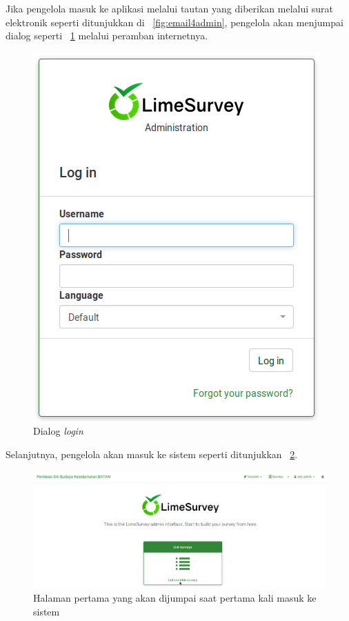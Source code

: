 Jika pengelola masuk ke aplikasi melalui tautan yang diberikan melalui surat elektronik seperti ditunjukkan di \figurename~\ref{fig:email4admin}, pengelola akan menjumpai dialog seperti \figurename~\ref{fig:login} melalui peramban internetnya.
\begin{figure}
  \begin{center}
    \includegraphics[scale=.45]{pics/login.png}
    \caption{Dialog \textit{login}}
    \label{fig:login}
  \end{center}
\end{figure}

Selanjutnya, pengelola akan masuk ke sistem seperti ditunjukkan \figurename~\ref{fig:masukPertama}.
\begin{figure}
  \begin{center}
    \includegraphics[scale=.35]{pics/masukPertama.png}
    \caption{Halaman pertama yang akan dijumpai saat pertama kali masuk ke sistem}
    \label{fig:masukPertama}
  \end{center}
\end{figure}

